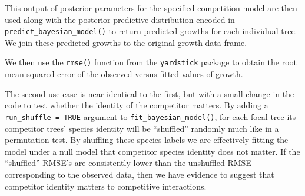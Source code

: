 \documentclass[12pt]{article}
\newenvironment{Shaded}{\begin{snugshade}}{\end{snugshade}}
\newcommand{\CommentTok}[1]{\textcolor[rgb]{0.56,0.35,0.01}{\textit{#1}}}
\newcommand{\DataTypeTok}[1]{\textcolor[rgb]{0.13,0.29,0.53}{#1}}
\newcommand{\KeywordTok}[1]{\textcolor[rgb]{0.13,0.29,0.53}{\textbf{#1}}}
\newcommand{\NormalTok}[1]{#1}
\newcommand{\OperatorTok}[1]{\textcolor[rgb]{0.81,0.36,0.00}{\textbf{#1}}}
\newcommand{\OtherTok}[1]{\textcolor[rgb]{0.56,0.35,0.01}{#1}}
\newcommand{\StringTok}[1]{\textcolor[rgb]{0.31,0.60,0.02}{#1}}
\begin{document}
\begin{Shaded}
\end{Shaded}

This output of posterior parameters for the specified competition model
are then used along with the posterior predictive distribution encoded
in \texttt{predict\_bayesian\_model()} to return predicted growths for
each individual tree. We join these predicted growths to the original
growth data frame.

\begin{Shaded}
\end{Shaded}

We then use the \texttt{rmse()} function from the \texttt{yardstick}
package to obtain the root mean squared error of the observed versus
fitted values of growth.

\begin{Shaded}
\end{Shaded}

The second use case is near identical to the first, but with a small
change in the code to test whether the identity of the competitor
matters. By adding a \texttt{run\_shuffle\ =\ TRUE} argument to
\texttt{fit\_bayesian\_model()}, for each focal tree its competitor
trees' species identity will be ``shuffled'' randomly much like in a
permutation test. By shuffling these species labels we are effectively
fitting the model under a null model that competitor species identity
does not matter. If the ``shuffled'' RMSE's are consistently lower than
the unshuffled RMSE corresponding to the observed data, then we have
evidence to suggest that competitor identity matters to competitive
interactions.
\end{document}
